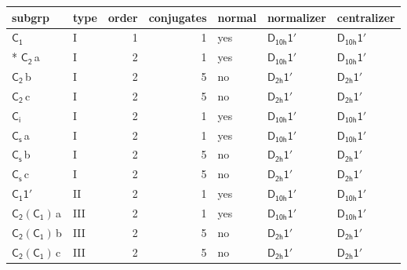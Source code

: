 \documentclass[10pt,a4paper]{article}
\numberwithin{equation}{section}
\newcommand{\grp}[1]{\mathsf{#1}}
\newcommand{\clsletter}[1]{\,{\scriptsize\color{black!55}#1}}
\begin{document}
{\small\begin{longtable}{@{}llrrlll@{}}\toprule
subgrp & type & order & conjugates & normal & normalizer & centralizer\\\midrule\endhead
\bottomrule\endfoot\endlastfoot
\href{../../../rotation/data/pdf/C1.pdf}{$\grp{C_{1}}$} & I & 1 & 1 & yes & \href{D10h-1p.pdf}{$\grp{D_{10h}1'}$} & \href{D10h-1p.pdf}{$\grp{D_{10h}1'}$}\\*
\href{../../../rotation/data/pdf/C2.pdf}{$\grp{C_{2}}$}\clsletter{a} & I & 2 & 1 & yes & \href{D10h-1p.pdf}{$\grp{D_{10h}1'}$} & \href{D10h-1p.pdf}{$\grp{D_{10h}1'}$}\\
\href{../../../rotation/data/pdf/C2.pdf}{$\grp{C_{2}}$}\clsletter{b} & I & 2 & 5 & no & \href{D2h-1p.pdf}{$\grp{D_{2h}1'}$} & \href{D2h-1p.pdf}{$\grp{D_{2h}1'}$}\\
\href{../../../rotation/data/pdf/C2.pdf}{$\grp{C_{2}}$}\clsletter{c} & I & 2 & 5 & no & \href{D2h-1p.pdf}{$\grp{D_{2h}1'}$} & \href{D2h-1p.pdf}{$\grp{D_{2h}1'}$}\\
\href{../../../rotation/data/pdf/S2.pdf}{$\grp{C_{i}}$} & I & 2 & 1 & yes & \href{D10h-1p.pdf}{$\grp{D_{10h}1'}$} & \href{D10h-1p.pdf}{$\grp{D_{10h}1'}$}\\
\href{../../../rotation/data/pdf/C1v.pdf}{$\grp{C_{s}}$}\clsletter{a} & I & 2 & 1 & yes & \href{D10h-1p.pdf}{$\grp{D_{10h}1'}$} & \href{D10h-1p.pdf}{$\grp{D_{10h}1'}$}\\
\href{../../../rotation/data/pdf/C1v.pdf}{$\grp{C_{s}}$}\clsletter{b} & I & 2 & 5 & no & \href{D2h-1p.pdf}{$\grp{D_{2h}1'}$} & \href{D2h-1p.pdf}{$\grp{D_{2h}1'}$}\\
\href{../../../rotation/data/pdf/C1v.pdf}{$\grp{C_{s}}$}\clsletter{c} & I & 2 & 5 & no & \href{D2h-1p.pdf}{$\grp{D_{2h}1'}$} & \href{D2h-1p.pdf}{$\grp{D_{2h}1'}$}\\
\href{C1-1p.pdf}{$\grp{C_{1}1'}$} & II & 2 & 1 & yes & \href{D10h-1p.pdf}{$\grp{D_{10h}1'}$} & \href{D10h-1p.pdf}{$\grp{D_{10h}1'}$}\\
\href{C2-C1.pdf}{$\grp{C_{2}}(\grp{C_{1}})$}\clsletter{a} & III & 2 & 1 & yes & \href{D10h-1p.pdf}{$\grp{D_{10h}1'}$} & \href{D10h-1p.pdf}{$\grp{D_{10h}1'}$}\\
\href{C2-C1.pdf}{$\grp{C_{2}}(\grp{C_{1}})$}\clsletter{b} & III & 2 & 5 & no & \href{D2h-1p.pdf}{$\grp{D_{2h}1'}$} & \href{D2h-1p.pdf}{$\grp{D_{2h}1'}$}\\
\href{C2-C1.pdf}{$\grp{C_{2}}(\grp{C_{1}})$}\clsletter{c} & III & 2 & 5 & no & \href{D2h-1p.pdf}{$\grp{D_{2h}1'}$} & \href{D2h-1p.pdf}{$\grp{D_{2h}1'}$}\\

\end{longtable}}
\end{document}
